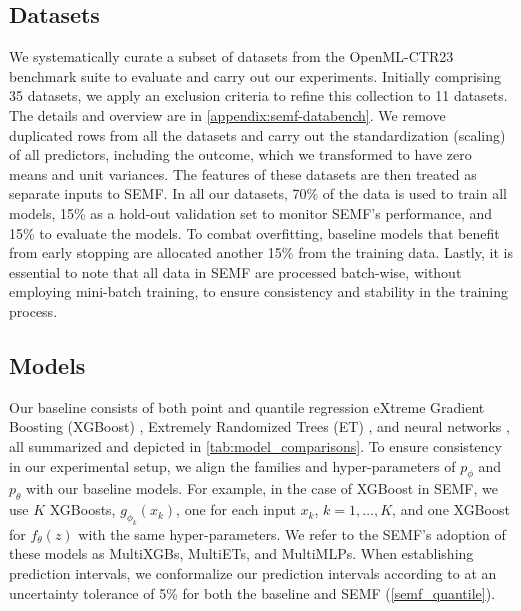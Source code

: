 \documentclass{article}
\begin{document}
\subsection{Datasets}
We systematically curate a subset of datasets from the OpenML-CTR23 \cite{fischer2023}  benchmark suite to evaluate and carry out our experiments. Initially comprising 35 datasets, we apply an exclusion criteria to refine this collection to 11 datasets. The details and overview are in \autoref{appendix:semf-databench}. We remove duplicated rows from all the datasets and carry out the standardization (scaling) of all predictors, including the outcome, which we transformed to have zero means and unit variances. The features of these datasets are then treated as separate inputs to SEMF. 
In all our datasets, 70\% of the data is used to train all models, 15\% as a hold-out validation set to monitor SEMF's performance, and 15\% to evaluate the models. To combat overfitting, baseline models that benefit from early stopping are allocated another 15\% from the training data. Lastly, it is essential to note that all data in SEMF are processed batch-wise, without employing mini-batch training, to ensure consistency and stability in the training process.

\subsection{Models}
\label{experiment_models}
Our baseline consists of both point and quantile regression eXtreme Gradient Boosting (XGBoost) \cite{Chen2016}, Extremely Randomized Trees (ET) \cite{geurts2006extremely}, and neural networks \cite{tagasovska2019single}, all summarized and depicted in \autoref{tab:model_comparisons}. To ensure consistency in our experimental setup, we align the families and hyper-parameters of $p_{\phi}$ and $p_{\theta}$ with our baseline models. For example, in the case of XGBoost in SEMF, we use $K$ XGBoosts, $g_{\phi_k}(x_k)$, one for each input $x_k$, $k=1,\ldots, K$, and one XGBoost for $f_\theta(z)$ with the same hyper-parameters. We refer to the SEMF's adoption of these models as MultiXGBs, MultiETs, and MultiMLPs. When establishing prediction intervals, we conformalize our prediction intervals according to \cite{romano2019cqr} at an uncertainty tolerance of 5\% for both the baseline and SEMF (\autoref{semf_quantile}). 
\end{document}
